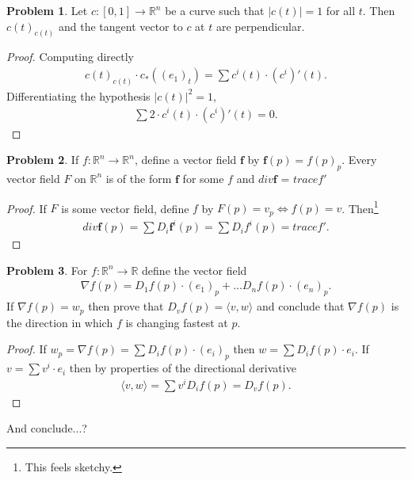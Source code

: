 \documentclass[20pt]{article}
\theoremstyle{plain}
\theoremstyle{definition}
\newtheorem*{problem}{Problem}
\newcommand{\reals}{\mathbb{R}}
\begin{document}
\begin{problem}{4.16}
  Let $c: [0, 1] \to \reals^n$ be a curve such that $|c(t)| = 1$ for all $t$.
  Then $c(t)_{c(t)}$ and the tangent vector to $c$ at $t$ are perpendicular.
\end{problem}
\begin{proof}
  Computing directly
  \begin{align*}
    c(t)_{c(t)} \cdot c_*((e_1)_t) = \sum c^i(t) \cdot (c^i)'(t).
  \end{align*}
  Differentiating the hypothesis $|c(t)|^2 = 1$,
  \begin{align*}
    \sum 2 \cdot c^i(t) \cdot (c^i)'(t) = 0.
  \end{align*}
\end{proof}














\begin{problem}{4.17}
  If $f: \reals^n \to \reals^n$, define a vector  field $\pmb{f}$ by $\pmb{f}(p) = f(p)_p$.
  Every vector  field $F$ on $\reals^n$ is of the form $\pmb{f}$ for
  some $f$ and $div \pmb{f}$ = $trace f'$
\end{problem}

\begin{proof}
  If $F$ is some vector field, define $f$ by $F(p) = v_p \iff f(p) = v$.
  Then\footnote{This feels sketchy.}
  \begin{align*}
    div\pmb{f}(p) =
    \sum D_i\pmb{f}^i(p) =
    \sum D_i f^i(p) =
    trace f'.
  \end{align*}
\end{proof}







\begin{problem}{4.18}
  For $f: \reals^n \to \reals$ define the vector field
  \begin{align*}
    \nabla f (p) = D_1f(p)\cdot (e_1)_p + ... D_nf(p)\cdot (e_n)_p.
  \end{align*}
  If $\nabla f(p) = w_p$ then prove that $D_vf(p) = \langle v, w \rangle$ and
  conclude that $\nabla f (p)$ is the direction in which $f$ is changing fastest at $p$.
\end{problem}
\begin{proof}
  If $w_p = \nabla f (p) = \sum D_i f(p) \cdot (e_i)_p$ then $w = \sum D_i f(p) \cdot e_i.$
  If $v = \sum v^i \cdot e_i$ then by properties of the directional derivative
  \begin{align}
    \langle v, w \rangle =
    \sum v^i D_if(p) = D_v f(p).
  \end{align}
\end{proof}
{\color{Blue} And conclude...?}
\end{document}
